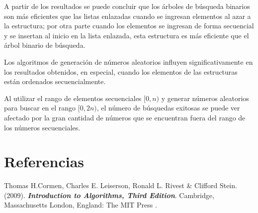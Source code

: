 \documentclass[twocolumn,english,spanish,journal]{IEEEtran}
\begin{document}
A partir de los resultados se puede concluir que los árboles de búsqueda binarios son más eficientes que las listas enlazadas cuando se ingresan elementos al azar a la estructura; por otra parte cuando los elementos se ingresan de forma secuencial y se insertan al inicio en la lista enlazada, esta estructura es más eficiente que el árbol binario de búsqueda.\newline

Los algoritmos de generación de números aleatorios influyen significativamente en los resultados obtenidos, en especial, cuando los elementos de las estructuras están ordenados secuencialmente.\newline

Al utilizar el rango de elementos secuenciales $[0, n)$ y generar números aleatorios para buscar en el rango $[0, 2n)$, el número de búsquedas exitosas se puede ver afectado por la gran cantidad de números que se encuentran fuera del rango de los números secuenciales.\newline


\section{Referencias}

Thomas H.Cormen, Charles E. Leiserson, Ronald L. Rivest \& Clifford Stein. (2009). \textbf{\textit{Introduction to Algorithms, Third Edition}}. Cambridge, Massachusetts London, England: The MIT Press .
\end{document}
